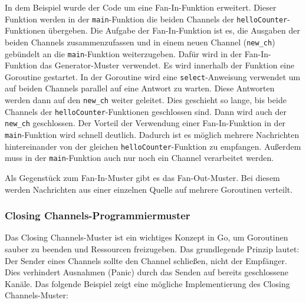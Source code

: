\documentclass[fontsize=12pt,paper=a4,twoside=semi,parskip=half-,headsepline,headinclude]{scrreprt}
\begin{document}
In dem Beispiel wurde der Code um eine Fan-In-Funktion erweitert. Dieser Funktion werden in der \texttt{main}-Funktion die beiden Channels der \texttt{helloCounter}-Funktionen übergeben. Die Aufgabe der Fan-In-Funktion ist es, die Ausgaben der beiden Channels zusammenzufassen und in einem neuen Channel (\texttt{new\_ch}) gebündelt an die \texttt{main}-Funktion weiterzugeben. Dafür wird in der Fan-In-Funktion das Generator-Muster verwendet. Es wird innerhalb der Funktion eine Goroutine gestartet. In der Goroutine wird eine \texttt{select}-Anweisung verwendet um auf beiden Channels parallel auf eine Antwort zu warten. Diese Antworten werden dann auf den \texttt{new\_ch} weiter geleitet. Dies geschieht so lange, bis beide Channels der \texttt{helloCounter}-Funktionen geschlossen sind. Dann wird auch der \texttt{new\_ch} geschlossen. Der Vorteil der Verwendung einer Fan-In-Funktion in der \texttt{main}-Funktion wird schnell deutlich. Dadurch ist es möglich mehrere Nachrichten hintereinander von der gleichen \texttt{helloCounter}-Funktion zu empfangen. Außerdem muss in der \texttt{main}-Funktion auch nur noch ein Channel verarbeitet werden. 

Als Gegenstück zum Fan-In-Muster gibt es das Fan-Out-Muster. Bei diesem werden Nachrichten aus einer einzelnen Quelle auf mehrere Goroutinen verteilt.

\subsubsection{Closing Channels-Programmiermuster}
\label{subsubsec:closingchannel}

Das Closing Channels-Muster ist ein wichtiges Konzept in Go, um Goroutinen sauber zu beenden und Ressourcen freizugeben. Das grundlegende Prinzip lautet: Der Sender eines Channels sollte den Channel schließen, nicht der Empfänger. Dies verhindert Ausnahmen (Panic) durch das Senden auf bereits geschlossene Kanäle. Das folgende Beispiel zeigt eine mögliche Implementierung des Closing Channels-Muster:
\end{document}
